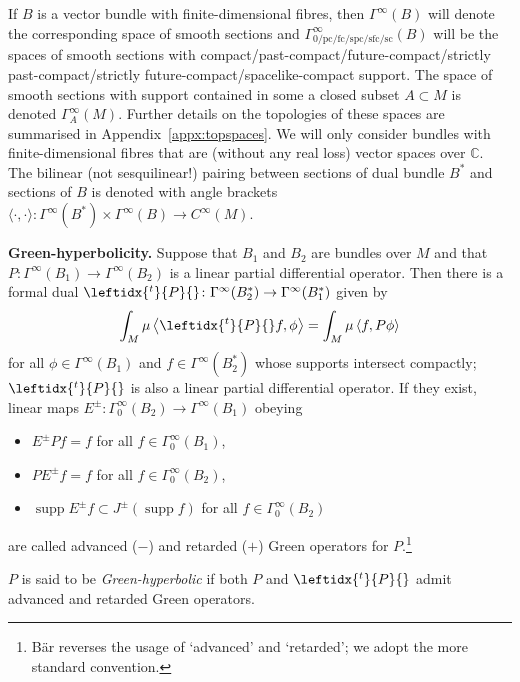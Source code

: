\documentclass[pdftex]{sigma}
\numberwithin{equation}{section}
\newcommand{\CC}{{\mathbb C}}
\newcommand{\GoinX}[1]{\Gamma_0^\infty({#1})}
\newcommand{\fc}{\mathrm{fc}}
\newcommand{\pc}{\mathrm{pc}}
\newcommand{\sfc}{\mathrm{sfc}}
\newcommand{\spc}{\mathrm{spc}}
\DeclareMathOperator{\supp}{supp}
\newcommand{\adj}[1]{\leftidx{^{t}}{#1}{}}
\begin{document}
 If $B$ is a vector bundle with finite-dimensional fibres, then $\Gamma^\infty(B)$ will denote the corresponding space of smooth sections and $\Gamma_{0/\pc/\fc/\spc/\sfc/\mathrm{sc}}^\infty(B)$ will be the spaces of smooth sections with com\-pact/past-compact/future-compact/strictly past-compact/strictly future-compact/space\-li\-ke-compact support. The space of smooth sections with support contained in some a closed subset $A\subset M$ is denoted $\Gamma^\infty_A(M)$. Further details on the topologies of these spaces are summarised in Appendix~\ref{appx:topspaces}. We will only consider bundles with finite-dimensional fibres that are (without any real loss) vector spaces over $\CC$. The bilinear (not sesquilinear!) pairing between sections of dual bundle $B^*$ and sections of $B$ is denoted with angle brackets $\langle \cdot,\cdot\rangle \colon \Gamma^\infty(B^*)\times \Gamma^\infty(B)\to C^\infty(M)$.

{\bf Green-hyperbolicity.} Suppose that $B_1$ and $B_2$ are bundles over $M$ and that $P\colon \Gamma^\infty(B_1)\to \Gamma^\infty(B_2)$ is a linear partial differential operator. Then there is a formal dual $\adj{P}\colon \Gamma^\infty(B_2^*)\to \Gamma^\infty(B_1^*)$ given by
 \begin{equation*}
 	\int_M \mu\, \big\langle \adj{P}f, \phi\big\rangle = \int_M\mu\, \langle f, P\phi\rangle
 \end{equation*}
 for all $\phi\in \Gamma^\infty(B_1)$ and $f\in \Gamma^\infty(B_2^*)$ whose supports intersect compactly; $\adj{P}$ is also a linear partial differential operator.
 If they exist, linear maps $E^\pm\colon \GoinX{B_2}\to \Gamma^\infty(B_1)$ obeying
 \begin{itemize}\itemsep=0pt
 	\item[(G1)] $E^\pm P f=f$ for all $f\in\GoinX{B_1}$,
 	\item[(G2)] $P E^\pm f = f$ for all $f\in\GoinX{B_2}$,
 	\item[(G3)] $\supp E^\pm f \subset J^\pm (\supp f)$ for all $f\in\GoinX{B_2}$
 \end{itemize}
 are called advanced ($-$) and retarded ($+$) Green operators for $P$.\footnote{B\"ar reverses the usage of `advanced' and `retarded'; we adopt the more standard convention.}
 \begin{Definition}
 	$P$ is said to be \emph{Green-hyperbolic} if both $P$ and $\adj{P}$ admit advanced and retarded Green operators.
 \end{Definition}
\end{document}
